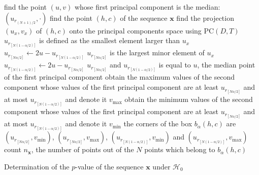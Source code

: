 \begin{algorithm}[hbt]
	find the point $(u,v)$ whose first principal component is the median: $(u_{r_{(N+1)/2}}, \cdot)$\;
	find the point $(h,c)$ of the sequence $\bm x$\;
	find the projection $(u_x,v_x)$ of $(h,c)$ onto the principal components space using $\text{PC}(D,T)$\;	
	{ $u_{r_{[N(1-\alpha/2)]}}$ is defined as the smallest element larger than $u_x$\;
		$u_{r_{[N\alpha/2]}} \leftarrow 2u - u_{r_{[N(1-\alpha/2)]}}$\;
	}
	{
		{ $u_{r_{[N\alpha/2]}}$ is the largest minor element of $u_x$\;
			$u_{r_{[N(1-\alpha/2)]}} \leftarrow 2u - u_{r_{[N\alpha/2]}}$\;
		}
		{ $u_{r_{[N\alpha/2]}}$ and $u_{r_{[N(1-\alpha/2)]}}$ is equal to $u$, the median point of the first principal component\; 
		}
	}
	obtain the maximum values of the second component whose values of the first principal component are at least $u_{r_{[N\alpha/2]}}$ and at most $u_{r_{[N(1-\alpha/2)]}}$ and denote it $v_{\max}$\;
	obtain the minimum values of the second component whose values of the first principal component are at least $u_{r_{[N\alpha/2]}}$ and at most $u_{r_{[N(1-\alpha/2)]}}$ and denote it $v_{\min}$\;
	the corners of the box $b_{\alpha}(h,c)$ are 
	$(u_{r_{[N\alpha/2]}}, v_{\min})$, 
	$(u_{r_{[N\alpha/2]}}, v_{\max})$, 
	$(u_{r_{[N(1-\alpha/2)]}}, v_{\min})$ and 
	$(u_{r_{[N(1-\alpha/2)]}}, v_{\max})$\;
	count $n_{\bm x}$, the number of points out of the $N$ points which belong to $b_{\alpha}(h,c)$\;
	\caption{Determination of the $p$-value of the sequence $\bm x$ under $\mathcal H_0$}\label{Algo:p-value}
\end{algorithm}

